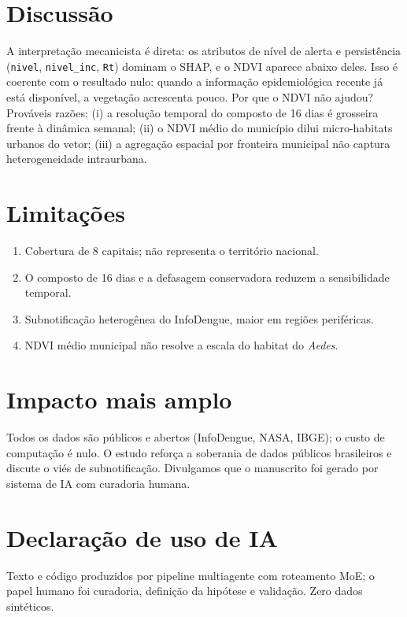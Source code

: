 \documentclass[12pt,a4paper]{article}
\begin{document}
\section{Discussão}
A interpretação mecanicista é direta: os atributos de nível de alerta e
persistência (\texttt{nivel}, \texttt{nivel\_inc}, \texttt{Rt}) dominam o SHAP,
e o NDVI aparece abaixo deles. Isso é coerente com o resultado nulo: quando a
informação epidemiológica recente já está disponível, a vegetação acrescenta
pouco. Por que o NDVI não ajudou? Prováveis razões: (i) a resolução temporal do
composto de 16 dias é grosseira frente à dinâmica semanal; (ii) o NDVI médio do
município dilui micro-habitats urbanos do vetor; (iii) a agregação espacial por
fronteira municipal não captura heterogeneidade intraurbana.

\section{Limitações}
\begin{enumerate}
\item Cobertura de 8 capitais; não representa o território nacional.
\item O composto de 16 dias e a defasagem conservadora reduzem a sensibilidade temporal.
\item Subnotificação heterogênea do InfoDengue, maior em regiões periféricas.
\item NDVI médio municipal não resolve a escala do habitat do \emph{Aedes}.
\end{enumerate}

\section{Impacto mais amplo}
Todos os dados são públicos e abertos (InfoDengue, NASA, IBGE); o custo de
computação é nulo. O estudo reforça a soberania de dados públicos brasileiros e
discute o viés de subnotificação. Divulgamos que o manuscrito foi gerado por
sistema de IA com curadoria humana.

\section{Declaração de uso de IA}
Texto e código produzidos por pipeline multiagente com roteamento MoE; o papel
humano foi curadoria, definição da hipótese e validação. Zero dados sintéticos.
\end{document}
